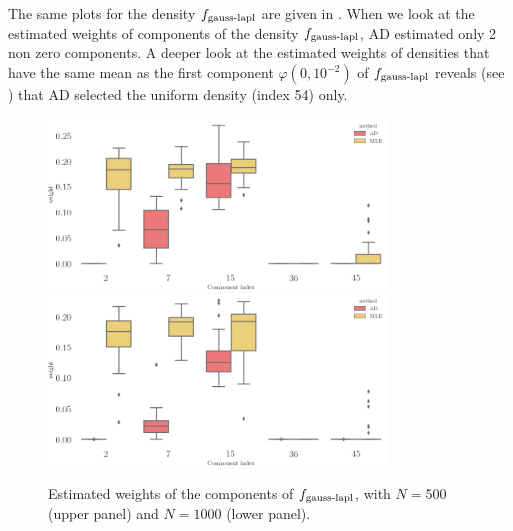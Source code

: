 The same plots for the density $f_{\textnormal{gauss-lapl}}$ are given in . 
When we look at the estimated weights of components of the density $f_{\textnormal{gauss-lapl}}$, AD estimated only 2 non zero components. A deeper look at the estimated weights of densities that have the same mean as the first component $\varphi(0, 10^{-2})$ of $f_{\textnormal{gauss-lapl}}$ reveals (see ) that AD selected the uniform density (index 54) only. 
\begin{figure}
\center
    \includegraphics[width=0.8\textwidth]{./TeX_files/weight_f_gauss_laplace_real_comp_N_500.png}
    \includegraphics[width=0.8\textwidth]{./TeX_files/weight_f_gauss_laplace_real_comp_N_1000.png}
    \caption{Estimated weights of the components of $f_{\textnormal{gauss-lapl}}$, with $N=500$ (upper panel) and $N=1000$
    (lower panel).}
    \label{fig:weights_gauss_laplace_real_indexes}
\end{figure}
